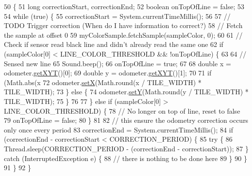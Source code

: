 \begin{DoxyCode}
50                     \{
51     \textcolor{keywordtype}{long} correctionStart, correctionEnd;
52     \textcolor{keywordtype}{boolean} onTopOfLine = \textcolor{keyword}{false};
53 
54     \textcolor{keywordflow}{while} (\textcolor{keyword}{true}) \{
55       correctionStart = System.currentTimeMillis();
56 
57       \textcolor{comment}{// TODO Trigger correction (When do I have information to correct?)}
58       \textcolor{comment}{// Fetch the sample at offset 0}
59       myColorSample.fetchSample(sampleColor, 0);
60 
61       \textcolor{comment}{// Check if sensor read black line and didn't already read the same one}
62       \textcolor{keywordflow}{if} (sampleColor[0] < LINE\_COLOR\_THRESHOLD && !onTopOfLine) \{
63 
64         \textcolor{comment}{// Sensed new line}
65         Sound.beep();
66         onTopOfLine = \textcolor{keyword}{true};
67 
68         \textcolor{keywordtype}{double} x = odometer.\hyperlink{classca_1_1mcgill_1_1ecse211_1_1odometer_1_1_odometer_data_a8f40f0264c68f0cbed4fff1723ae7863}{getXYT}()[0];
69         \textcolor{keywordtype}{double} y = odometer.\hyperlink{classca_1_1mcgill_1_1ecse211_1_1odometer_1_1_odometer_data_a8f40f0264c68f0cbed4fff1723ae7863}{getXYT}()[1];
70 
71         \textcolor{keywordflow}{if} (Math.abs(x %
72           odometer.\hyperlink{classca_1_1mcgill_1_1ecse211_1_1odometer_1_1_odometer_data_a2911d7215e47f3064defe016b46bfeef}{setX}(Math.round(x / TILE\_WIDTH) * TILE\_WIDTH);
73         \} \textcolor{keywordflow}{else} \{
74           odometer.\hyperlink{classca_1_1mcgill_1_1ecse211_1_1odometer_1_1_odometer_data_a82986438cd462e66520bc62bb4bd2b75}{setY}(Math.round(y / TILE\_WIDTH) * TILE\_WIDTH);
75         \}
76 
77       \} \textcolor{keywordflow}{else} \textcolor{keywordflow}{if} (sampleColor[0] > LINE\_COLOR\_THRESHOLD) \{
78         \textcolor{comment}{// No longer on top of line, reset to false}
79         onTopOfLine = \textcolor{keyword}{false};
80       \}
81 
82       \textcolor{comment}{// this ensure the odometry correction occurs only once every period}
83       correctionEnd = System.currentTimeMillis();
84       \textcolor{keywordflow}{if} (correctionEnd - correctionStart < CORRECTION\_PERIOD) \{
85         \textcolor{keywordflow}{try} \{
86           Thread.sleep(CORRECTION\_PERIOD - (correctionEnd - correctionStart));
87         \} \textcolor{keywordflow}{catch} (InterruptedException e) \{
88           \textcolor{comment}{// there is nothing to be done here}
89         \}
90       \}
91     \}
92   \}
\end{DoxyCode}
